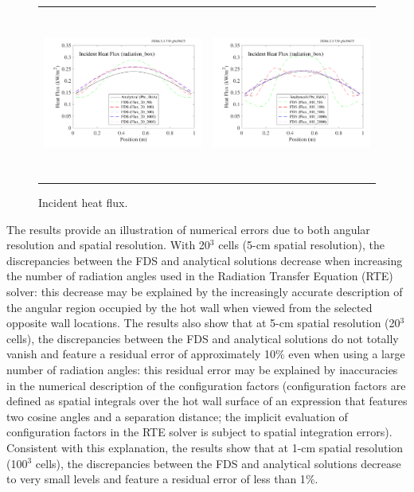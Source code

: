 \documentclass[11pt]{book}
\begin{document}
\begin{figure}[ht]
\centering
\begin{tabular*}{\textwidth}{lr}
\includegraphics[height=2.2in]{SCRIPT_FIGURES/radiation_box_20} &
\includegraphics[height=2.2in]{SCRIPT_FIGURES/radiation_box_100}
\end{tabular*}
\caption{Incident heat flux.}\label{fig_incident_heat_flux}
\end{figure}

The results provide an illustration of numerical errors due to both angular resolution and spatial resolution. With 20$^3$ cells (5-cm spatial resolution), the discrepancies between the FDS and analytical solutions decrease when increasing the number of radiation angles used in the Radiation Transfer Equation (RTE) solver: this decrease may be explained by the increasingly accurate description of the angular region occupied by the hot wall when viewed from the selected opposite wall locations. The results also show that at 5-cm spatial resolution (20$^3$ cells), the discrepancies between the FDS and analytical solutions do not totally vanish and feature a residual error of approximately 10$\%$ even when using a large number of radiation angles: this residual error may be explained by inaccuracies in the numerical description of the configuration factors (configuration factors are defined as spatial integrals over the hot wall surface of an expression that features two cosine angles and a separation distance; the implicit evaluation of configuration factors in the RTE solver is subject to spatial integration errors). Consistent with this explanation, the results show that at 1-cm spatial resolution (100$^3$ cells), the discrepancies between the FDS and analytical solutions decrease to very small levels and feature a residual error of less than 1$\%$.
\end{document}
